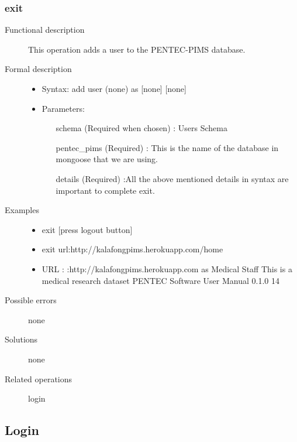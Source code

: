 \documentclass[a4paper]{article}
\begin{document}
\subsubsection{exit}
\begin{description}
\item[Functional description] This operation adds a user to the PENTEC-PIMS database.
\item[Formal description]\hfill
\begin{itemize}
	\item Syntax: add user (none) as [none] [none]\\
	\item Parameters:
	\begin{itemize}
		\item [schema] (Required when chosen) : Users Schema
		\item [pentec\_pims] (Required) : This is the name of the database in mongoose that we are using.
		\item [details] (Required) :All the above mentioned details in syntax are important to complete exit.
	\end{itemize}
\end{itemize}

\item[Examples]\hfill
\begin{itemize}
	\item exit [press logout button]
	\item exit url:http://kalafongpims.herokuapp.com/home
	\item URL : :http://kalafongpims.herokuapp.com as Medical Staff This is a medical research dataset
	PENTEC Software User Manual 0.1.0 14
\end{itemize}

\item[Possible errors] none
\item[Solutions] none
\item [Related operations] login
\end{description}

\subsection{Login}
\end{document}
